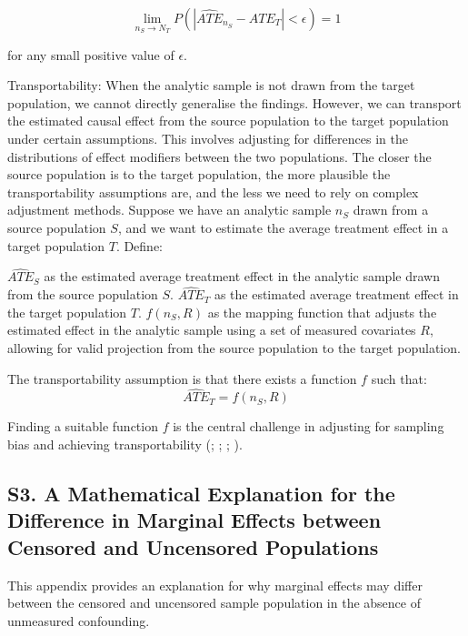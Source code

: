 \documentclass[
  single column]{article}
\begin{document}
\[
\lim_{n_S \to N_T} P(|\widehat{ATE}_{n_S} - ATE_{T}| < \epsilon) = 1
\]

for any small positive value of \(\epsilon\).

Transportability: When the analytic sample is not drawn from the target
population, we cannot directly generalise the findings. However, we can
transport the estimated causal effect from the source population to the
target population under certain assumptions. This involves adjusting for
differences in the distributions of effect modifiers between the two
populations. The closer the source population is to the target
population, the more plausible the transportability assumptions are, and
the less we need to rely on complex adjustment methods. Suppose we have
an analytic sample \(n_S\) drawn from a source population \(S\), and we
want to estimate the average treatment effect in a target population
\(T\). Define:

\(\widehat{ATE}_{S}\) as the estimated average treatment effect in the
analytic sample drawn from the source population \(S\).
\(\widehat{ATE}_{T}\) as the estimated average treatment effect in the
target population \(T\). \(f(n_S, R)\) as the mapping function that
adjusts the estimated effect in the analytic sample using a set of
measured covariates \(R\), allowing for valid projection from the source
population to the target population.

The transportability assumption is that there exists a function \(f\)
such that: \[ \widehat{ATE}_{T} = f(n_S, R) \]

Finding a suitable function \(f\) is the central challenge in adjusting
for sampling bias and achieving transportability
(;
;
;
).

\newpage{}

\subsection{S3. A Mathematical Explanation for the Difference in
Marginal Effects between Censored and Uncensored
Populations}\label{id-app-c}

This appendix provides an explanation for why marginal effects may
differ between the censored and uncensored sample population in the
absence of unmeasured confounding.
\end{document}
